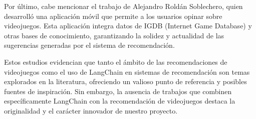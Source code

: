 Por último, cabe mencionar el trabajo de Alejandro Roldán Soblechero, quien desarrolló una aplicación móvil que permite a los usuarios opinar sobre videojuegos. Esta aplicación integra datos de IGDB (Internet Game Database) y otras bases de conocimiento, garantizando la solidez y actualidad de las sugerencias generadas por el sistema de recomendación. \cite{aplicacion-recomendacion-uoc}


Estos estudios evidencian que tanto el ámbito de las recomendaciones de videojuegos como el uso de LangChain en sistemas de recomendación son temas explorados en la literatura, ofreciendo un valioso punto de referencia y posibles fuentes de inspiración. Sin embargo, la ausencia de trabajos que combinen específicamente LangChain con la recomendación de videojuegos destaca la originalidad y el carácter innovador de nuestro proyecto. 